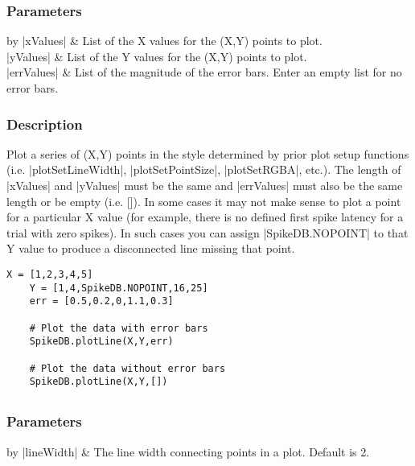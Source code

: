 \documentclass{report}
\begin{document}
\subsubsection{Parameters}
\begin{table}[h]
\begin{center}
\begin{tabular}{by}
		|xValues| & List of the X values for the (X,Y) points to plot.\\
		|yValues| & List of the Y values for the (X,Y) points to plot.\\
		|errValues| & List of the magnitude of the error bars. Enter an empty list for no error bars.\\
	\end{tabular}
\end{center}
\end{table}
\subsubsection{Description}
Plot a series of (X,Y) points in the style determined by prior plot setup functions (i.e. |plotSetLineWidth|, |plotSetPointSize|, |plotSetRGBA|, etc.). The length of |xValues| and |yValues| must be the same and |errValues| must also be the same length or be empty (i.e. []). In some cases it may not make sense to plot a point for a particular X value (for example, there is no defined first spike latency for a trial with zero spikes).  In such cases you can assign |SpikeDB.NOPOINT| to that Y value to produce a disconnected line missing that point.
\begin{lstlisting}[caption=Example]
	X = [1,2,3,4,5]
	Y = [1,4,SpikeDB.NOPOINT,16,25]
	err = [0.5,0.2,0,1.1,0.3]

	# Plot the data with error bars
	SpikeDB.plotLine(X,Y,err)

	# Plot the data without error bars
	SpikeDB.plotLine(X,Y,[])
\end{lstlisting}



\clearpage
\subsection{}
\subsubsection{Parameters}
\begin{table}[h]
\begin{center}
\begin{tabular}{by}
		|lineWidth| & The line width connecting points in a plot. Default is 2.\\ 
	\end{tabular}
\end{center}
\end{table}
\end{document}
